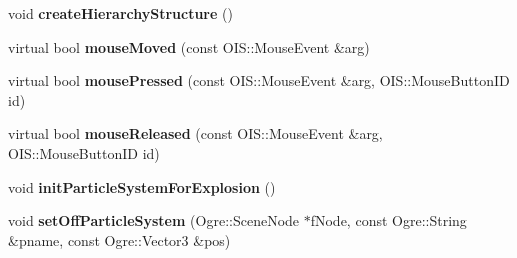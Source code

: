 \begin{DoxyCompactItemize}
\mbox{\label{class_basic_tutorial__00_a640606ec0a4e99a921d501f37e8be74c}} 
void {\bfseries create\+Hierarchy\+Structure} ()
\item 
\mbox{\label{class_basic_tutorial__00_a5b9bd30851c38fa6c2fa102f30e9629a}} 
virtual bool {\bfseries mouse\+Moved} (const O\+I\+S\+::\+Mouse\+Event \&arg)
\item 
\mbox{\label{class_basic_tutorial__00_af0e5dec72c58e157c2a63ffa5fd8c7c7}} 
virtual bool {\bfseries mouse\+Pressed} (const O\+I\+S\+::\+Mouse\+Event \&arg, O\+I\+S\+::\+Mouse\+Button\+ID id)
\item 
\mbox{\label{class_basic_tutorial__00_aeb28d7b68dcaf536f513e25afb6947d7}} 
virtual bool {\bfseries mouse\+Released} (const O\+I\+S\+::\+Mouse\+Event \&arg, O\+I\+S\+::\+Mouse\+Button\+ID id)
\item 
\mbox{\label{class_basic_tutorial__00_aba8ab595a3f9395bcfedd8c42861060a}} 
void {\bfseries init\+Particle\+System\+For\+Explosion} ()
\item 
\mbox{\label{class_basic_tutorial__00_af43d8f8693f38ed8eaf2af01de318b9b}} 
void {\bfseries set\+Off\+Particle\+System} (Ogre\+::\+Scene\+Node $\ast$f\+Node, const Ogre\+::\+String \&pname, const Ogre\+::\+Vector3 \&pos)
\end{DoxyCompactItemize}
